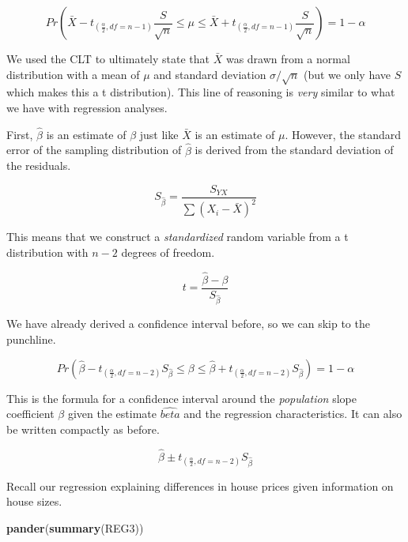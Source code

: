 \documentclass[
]{book}
\newenvironment{Shaded}{\begin{snugshade}}{\end{snugshade}}
\newcommand{\FunctionTok}[1]{\textcolor[rgb]{0.13,0.29,0.53}{\textbf{#1}}}
\newcommand{\NormalTok}[1]{#1}
\begin{document}
\[Pr\left(\bar{X}-t_{(\frac{\alpha}{2},df=n-1)}\frac{S}{\sqrt{n}} \leq \mu \leq \bar{X}+t_{(\frac{\alpha}{2},df=n-1)}\frac{S}{\sqrt{n}}\right)=1-\alpha\]

We used the CLT to ultimately state that \(\bar{X}\) was drawn from a normal distribution with a mean of \(\mu\) and standard deviation \(\sigma/\sqrt{n}\) (but we only have \(S\) which makes this a t distribution). This line of reasoning is \emph{very} similar to what we have with regression analyses.

First, \(\hat{\beta}\) is an estimate of \(\beta\) just like \(\bar{X}\) is an estimate of \(\mu\). However, the standard error of the sampling distribution of \(\hat{\beta}\) is derived from the standard deviation of the residuals.

\[S_{\hat{\beta}}=\frac{S_{YX}}{\sum{(X_i-\bar{X})^2}}\]

This means that we construct a \emph{standardized} random variable from a t distribution with \(n-2\) degrees of freedom.

\[t=\frac{\hat{\beta}-\beta}{S_{\hat{\beta}}}\]

We have already derived a confidence interval before, so we can skip to the punchline.

\[Pr\left(\hat{\beta}-t_{(\frac{\alpha}{2},df=n-2)}S_{\hat{\beta}} \leq \beta \leq \hat{\beta}+t_{(\frac{\alpha}{2},df=n-2)}S_{\hat{\beta}}\right)=1-\alpha\]

This is the formula for a confidence interval around the \emph{population} slope coefficient \(\beta\) given the estimate \(\hat{beta}\) and the regression characteristics. It can also be written compactly as before.

\[\hat{\beta} \pm t_{(\frac{\alpha}{2},df=n-2)} S_{\hat{\beta}}\]

Recall our regression explaining differences in house prices given information on house sizes.

\begin{Shaded}
\begin{Highlighting}[]
\FunctionTok{pander}\NormalTok{(}\FunctionTok{summary}\NormalTok{(REG3))}
\end{Highlighting}
\end{Shaded}
\end{document}
